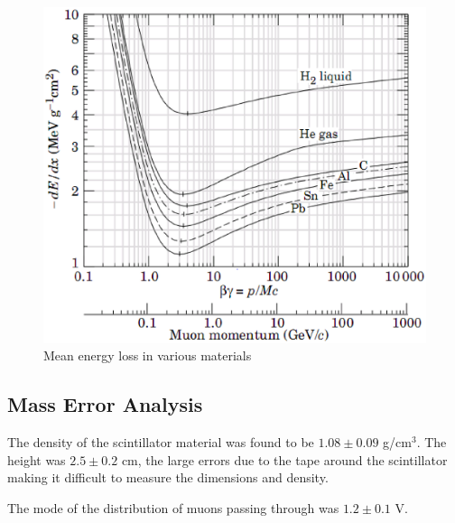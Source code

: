 \label{energy_loss}
\begin{figure}[h]
\begin{center}
\includegraphics[width = 130mm]{figures/energy_loss.eps}
\caption{\small{Mean energy loss in various materials \cite{yao.}}}
\label{figure:dEdx}
\end{center}
\end{figure}

\subsection{Mass Error Analysis}

The density of the scintillator material was found to be $1.08 \pm
0.09$ g/cm$^3$. The height was $2.5 \pm 0.2$ cm, the large errors due
to the tape around the scintillator making it difficult to measure the
dimensions and density.

The mode of the distribution of muons passing through was $1.2 \pm
0.1$ V. 

